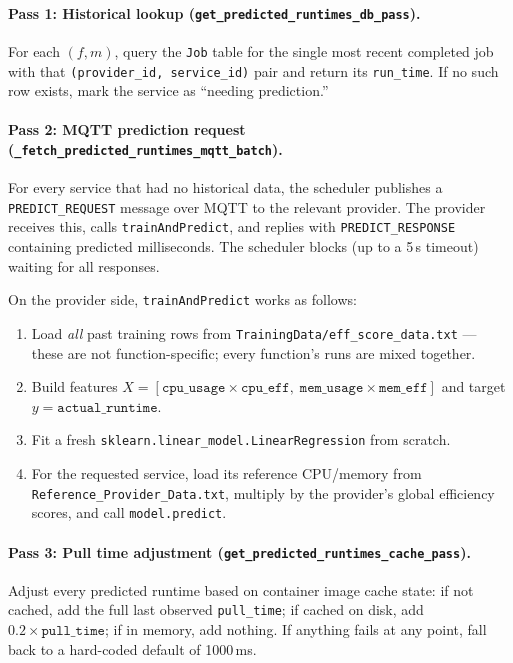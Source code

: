 \documentclass[11pt, a4paper]{article}
\begin{document}
\paragraph{Pass 1: Historical lookup
(\texttt{get\_predicted\_runtimes\_db\_pass}).}
For each $(f, m)$, query the \texttt{Job} table for the single most recent
completed job with that \texttt{(provider\_id, service\_id)} pair and return
its \texttt{run\_time}. If no such row exists, mark the service as
``needing prediction.''

\paragraph{Pass 2: MQTT prediction request
(\texttt{\_fetch\_predicted\_runtimes\_mqtt\_batch}).}
For every service that had no historical data, the scheduler publishes a
\texttt{PREDICT\_REQUEST} message over MQTT to the relevant provider. The
provider receives this, calls \texttt{trainAndPredict}, and replies with
\texttt{PREDICT\_RESPONSE} containing predicted milliseconds. The scheduler
blocks (up to a 5\,s timeout) waiting for all responses.

On the provider side, \texttt{trainAndPredict} works as follows:
\begin{enumerate}[nosep]
    \item Load \emph{all} past training rows from
          \texttt{TrainingData/eff\_score\_data.txt} --- these are not
          function-specific; every function's runs are mixed together.
    \item Build features $X = [\texttt{cpu\_usage} \times
          \texttt{cpu\_eff},\; \texttt{mem\_usage} \times
          \texttt{mem\_eff}]$ and target $y = \texttt{actual\_runtime}$.
    \item Fit a fresh \texttt{sklearn.linear\_model.LinearRegression}
          from scratch.
    \item For the requested service, load its reference CPU/memory from
          \texttt{Reference\_Provider\_Data.txt}, multiply by the
          provider's global efficiency scores, and call
          \texttt{model.predict}.
\end{enumerate}

\paragraph{Pass 3: Pull time adjustment
(\texttt{get\_predicted\_runtimes\_cache\_pass}).}
Adjust every predicted runtime based on container image cache state: if
not cached, add the full last observed \texttt{pull\_time}; if cached on
disk, add $0.2 \times \texttt{pull\_time}$; if in memory, add nothing.
If anything fails at any point, fall back to a hard-coded default of
1000\,ms.
\end{document}
